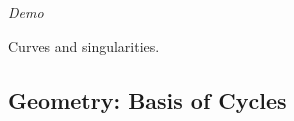 \documentclass{beamer}
\begin{document}
\begin{frame}{\phantom{Demo}}{}
  \begin{center}
    {\huge \it Demo}

    \vspace{1cm}

    Curves and singularities.
  \end{center}
\end{frame}



\subsection{Geometry: Basis of Cycles}
\end{document}
